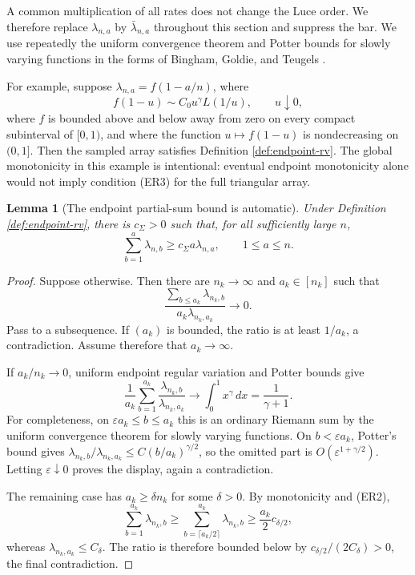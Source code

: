 \documentclass[11pt]{article}
\newtheorem{lemma}[theorem]{Lemma}
\theoremstyle{remark}
\newcommand{\dd}{\,d}
\begin{document}
A common multiplication of all rates does not change the Luce order.  We
therefore replace \(\lambda_{n,a}\) by \(\bar\lambda_{n,a}\) throughout this
section and suppress the bar.  We use repeatedly the uniform convergence
theorem and Potter bounds for slowly varying functions in the forms of
Bingham, Goldie, and Teugels \cite[Theorems~1.2.1 and~1.5.6]{BGT1987}.

For example, suppose \(\lambda_{n,a}=f(1-a/n)\), where
\[
        f(1-u)\sim C_0u^\gamma L(1/u),\qquad u\downarrow0,
\]
where \(f\) is bounded above and below away from zero on every compact
subinterval of \([0,1)\), and where the function
\(u\mapsto f(1-u)\) is nondecreasing on \((0,1]\).  Then the sampled array
satisfies Definition \ref{def:endpoint-rv}.  The global monotonicity in this
example is intentional: eventual endpoint monotonicity alone would not imply
condition \textup{(ER3)} for the full triangular array.

\begin{lemma}[The endpoint partial-sum bound is automatic]\label{lem:endpoint-partial-sum}
Under Definition \ref{def:endpoint-rv}, there is $c_\Sigma>0$ such that, for
all sufficiently large $n$,
\[
        \sum_{b=1}^a\lambda_{n,b}
        \ge c_\Sigma a\lambda_{n,a},
        \qquad 1\le a\le n.
\]
\end{lemma}

\begin{proof}
Suppose otherwise.  Then there are $n_k\to\infty$ and $a_k\in[n_k]$ such that
\[
        \frac{\sum_{b\le a_k}\lambda_{n_k,b}}
        {a_k\lambda_{n_k,a_k}}\longrightarrow0.
\]
Pass to a subsequence.  If $(a_k)$ is bounded, the ratio is at least $1/a_k$,
a contradiction.  Assume therefore that $a_k\to\infty$.

If $a_k/n_k\to0$, uniform endpoint regular variation and Potter bounds give
\[
        \frac1{a_k}\sum_{b=1}^{a_k}
        \frac{\lambda_{n_k,b}}{\lambda_{n_k,a_k}}
        \longrightarrow\int_0^1x^\gamma\dd x
        =\frac1{\gamma+1}.
\]
For completeness, on $\varepsilon a_k\le b\le a_k$ this is an ordinary
Riemann sum by the uniform convergence theorem for slowly varying functions.
On $b<\varepsilon a_k$, Potter's bound gives
$\lambda_{n_k,b}/\lambda_{n_k,a_k}\le C(b/a_k)^{\gamma/2}$, so the omitted
part is $O(\varepsilon^{1+\gamma/2})$.  Letting $\varepsilon\downarrow0$ proves
the display, again a contradiction.

The remaining case has $a_k\ge\delta n_k$ for some $\delta>0$.  By
monotonicity and (ER2),
\[
        \sum_{b=1}^{a_k}\lambda_{n_k,b}
        \ge\sum_{b=\lceil a_k/2\rceil}^{a_k}\lambda_{n_k,b}
        \ge \frac{a_k}{2}c_{\delta/2},
\]
whereas $\lambda_{n_k,a_k}\le C_\delta$.  The ratio is therefore bounded below
by $c_{\delta/2}/(2C_\delta)>0$, the final contradiction.
\end{proof}
\end{document}

